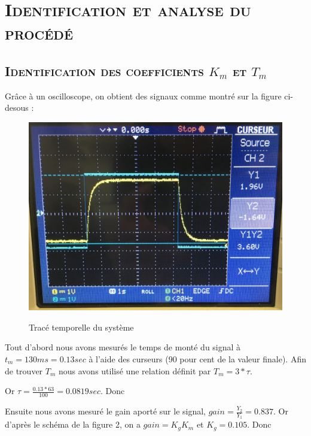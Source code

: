 \chapter{\textsc{Identification et analyse du procédé}}


\section{\textsc{Identification des coefficients $K_m$ et $T_m$}}

\par Grâce à un oscilloscope, on obtient des signaux comme montré sur la figure ci-desous :

\begin{figure}[h!]
\centering
\includegraphics[scale = 0.5]{trace_temp_syst.JPG}\\[1 cm] 
\caption{Tracé temporelle du système}
\end{figure}

\par Tout d'abord nous avons mesurés le temps de monté du signal à $t_m=130ms=0.13sec$ à l'aide des curseurs (90 pour cent de la valeur finale). Afin de trouver $T_m$ nous avons utilisé une relation définit par $T_m=3*\tau$. \\

\par Or $\tau=\frac{0.13*63}{100}=0.0819sec$. Donc \\

\par Ensuite nous avons mesuré le gain aporté sur le signal, $gain=\frac{Y_2}{Y_1}=0.837$. Or d'après le schéma de la figure 2, on a $gain=K_gK_m$ et $K_g=0.105$. Donc  \\

